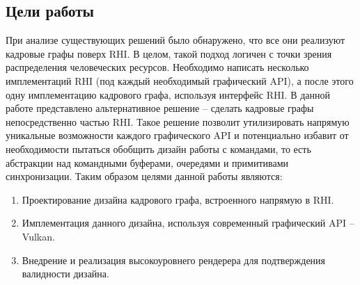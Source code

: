 \subsection{Цели работы}
При анализе существующих решений было обнаружено, что все они реализуют кадровые графы поверх RHI. В целом, такой подход логичен с точки зрения распределения человеческих ресурсов. Необходимо написать несколько имплементаций RHI (под каждый необходимый графический API), а после этого одну имплементацию кадрового графа, используя интерфейс RHI. В данной работе представлено альтернативное решение -- сделать кадровые графы непосредственно частью RHI. Такое решение позволит утилизировать напрямую уникальные возможности каждого графического API и потенциально избавит от необходимости пытаться обобщить дизайн работы с командами, то есть абстракции над командными буферами, очередями и примитивами синхронизации. Таким образом целями данной работы являются:
\begin{enumerate}
    \item Проектирование дизайна кадрового графа, встроенного напрямую в RHI.
    \item Имплементация данного дизайна, используя современный графический API -- Vulkan.
    \item Внедрение и реализация высокоуровнего рендерера для подтверждения валидности дизайна.
\end{enumerate}
